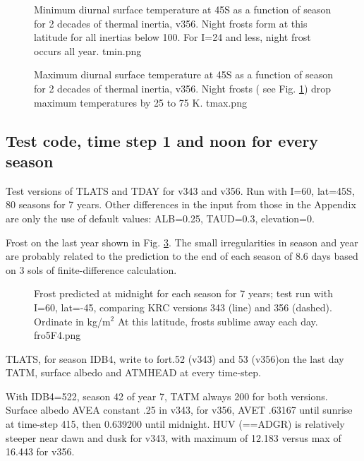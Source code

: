 \documentclass{article}
\begin{document}
\begin{figure}[!ht] 
\caption[Minimum Tsurf for 2 decades of I]{Minimum diurnal surface temperature
  at 45S as a function of season for 2 decades of thermal inertia, v356. Night frosts
  form at this latitude for all inertias below 100. For I=24 and less, night
  frost occurs all year.
\label{tmin}  tmin.png }
\end{figure} 

\begin{figure}[!ht] 
\caption[Maximum Tsurf for 2 decades of I]{Maximum diurnal surface temperature
  at 45S as a function of season for 2 decades of thermal inertia, v356. Night frosts
  ( see Fig. \ref{tmin}) drop maximum temperatures by 25 to 75 K.
\label{tmax}  tmax.png }
\end{figure} 

\clearpage
\subsection{Test code, time step 1 and noon for every season} %
Test versions of TLATS and TDAY for v343 and v356.  Run with I=60, lat=45S, 80
seasons for 7 years. Other differences in the input from those in the Appendix
are only the use of default values: ALB=0.25, TAUD=0.3, elevation=0.

Frost on the last year shown in Fig. \ref{fro5F4}. The small irregularities in
season and year are probably related to the prediction to the end of each
season of 8.6 days based on 3 sols of finite-difference calculation.

\begin{figure}[!ht] 
\caption[Run1 results for Frost]{Frost predicted at midnight for each season for
  7 years; test run with I=60, lat=-45, comparing KRC versions 343 (line) and
  356 (dashed). Ordinate in kg/m$^2$ At this latitude, frosts sublime away each
  day.
\label{fro5F4}  fro5F4.png }
\end{figure} 

TLATS, for season IDB4, write to fort.52 (v343) and 53 (v356)on the last day
TATM, surface albedo and ATMHEAD at every time-step.

With IDB4=522, season 42 of year 7, TATM always 200 for both versions. Surface
albedo AVEA constant .25 in v343, for v356, AVET .63167 until sunrise at
time-step 415, then 0.639200 until midnight.  HUV (==ADGR) is relatively steeper
near dawn and dusk for v343, with maximum of 12.183 versus max of 16.443 for
v356.
\end{document}
